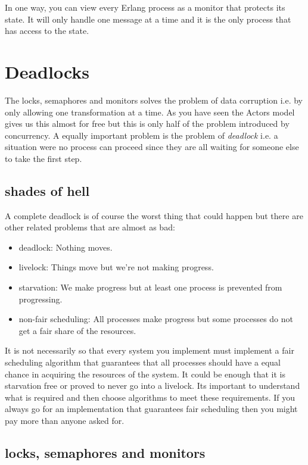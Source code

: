 \documentclass[a4paper,11pt]{article}
\begin{document}
In one way, you can view every Erlang process as a monitor that
protects its state. It will only handle one message at a time and it
is the only process that has access to the state.

\section{Deadlocks}

The locks, semaphores and monitors solves the problem of data
corruption i.e. by only allowing one transformation at a time. As you
have seen the Actors model gives us this almost for free but this is
only half of the problem introduced by concurrency. A equally important
problem is the problem of {\em deadlock} i.e. a situation were no
process can proceed since they are all waiting for someone else to
take the first step.

\subsection{shades of hell}

A complete deadlock is of course the worst thing that could happen but
there are other related problems that are almost as bad:

\begin{itemize}
 \item deadlock: Nothing moves.
 \item livelock: Things move but we're not making progress.
 \item starvation: We make progress but at least one process is prevented from progressing.
 \item non-fair scheduling: All processes make progress but some processes do not get a fair share of the resources. 
\end{itemize}

It is not necessarily so that every system you implement must
implement a fair scheduling algorithm that guarantees that all
processes should have a equal chance in acquiring the resources of the
system. It could be enough that it is starvation free or proved to
never go into a livelock. Its important to understand what is required
and then choose algorithms to meet these requirements. If you always
go for an implementation that guarantees fair scheduling then you
might pay more than anyone asked for.

\subsection{locks, semaphores and monitors}
\end{document}
